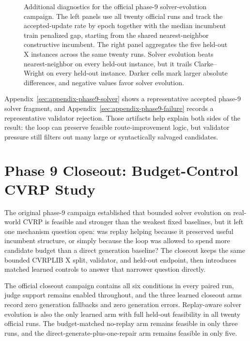 \begin{figure}[p]
\begin{minipage}[t]{0.46\textwidth}
\end{minipage}
\caption[Additional phase-9 diagnostics]{Additional diagnostics for the official phase-9 solver-evolution campaign. The left panels use all
twenty official runs and track the accepted-update rate by epoch together with the median incumbent
train penalized gap, starting from the shared nearest-neighbor constructive incumbent. The right
panel aggregates the five held-out X instances across the same twenty runs. Solver evolution beats
nearest-neighbor on every held-out instance, but it trails Clarke--Wright on every held-out
instance. Darker cells mark larger absolute differences, and negative values favor solver
evolution.}
\label{fig:phase9-phasewise-diagnostics}
\end{figure}

Appendix~\ref{sec:appendix-phase9-solver} shows a representative accepted phase-9 solver fragment,
and Appendix~\ref{sec:appendix-phase9-failure} records a representative validator rejection. Those
artifacts help explain both sides of the result: the loop can preserve feasible route-improvement
logic, but validator pressure still filters out many large or syntactically salvaged candidates.

\section{Phase 9 Closeout: Budget-Control CVRP Study}
\label{sec:advanced-phase9-closeout}

The original phase-9 campaign established that bounded solver evolution on real-world CVRP is
feasible and stronger than the weakest fixed baselines, but it left one mechanism question open:
was replay helping because it preserved useful incumbent structure, or simply because the loop was
allowed to spend more candidate budget than a direct generation baseline? The closeout keeps the
same bounded CVRPLIB X split, validator, and held-out endpoint, then introduces matched learned
controls to answer that narrower question directly.

The official closeout campaign contains all six conditions in every paired run, judge support
remains enabled throughout, and the three learned closeout arms record zero generation fallbacks
and zero generation errors. Replay-aware solver evolution is also the only learned arm with full
held-out feasibility in all twenty official runs. The budget-matched no-replay arm remains feasible
in only three runs, and the direct-generate-plus-one-repair arm remains feasible in only five.

